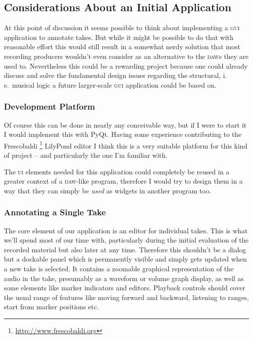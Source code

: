 \documentclass[11pt,a4paper]{article}
\begin{document}
\subsection{Considerations About an Initial Application}
At this point of discussion it seems possible to think about implementing a \textsc{gui} application to annotate takes.
But while it might be possible to do that with reasonable effort this would still result in a somewhat nerdy solution that most recording producers wouldn't even consider as an alternative to the \textsc{daw}s they are used to.
Nevertheless this could be a rewarding project because one could already discuss and solve the fundamental design issues regarding the structural, i.\,e.\ musical logic a future larger-scale \textsc{gui} application could be based on.

\subsubsection{Development Platform}
Of course this can be done in nearly any conceivable way, but if I were to start it I would implement this with PyQt.
Having some experience contributing to the Frescobaldi%
\footnote{\url{http://www.frescobaldi.org}}
LilyPond editor I think this is a very suitable platform for this kind of project -- and particularly the one I'm familiar with.

The \textsc{ui} elements needed for this application could completely be reused in a greater context of a \textsc{daw}-like program, therefore I would try to design them in a way that they can simply be \emph{used} as widgets in another program too.

\subsubsection{Annotating a Single Take}
The core element of our application is an editor for individual takes.
This is what we'll spend most of our time with, particularly during the initial evaluation of the recorded material but also later at any time.
Therefore this shouldn't be a dialog but a dockable panel which is permanently visible and simply gets updated when a new take is selected.
It contains a zoomable graphical representation of the audio in the take, presumably as a waveform or volume graph display, as well as some elements like marker indicators and editors.
Playback controls should cover the usual range of features like moving forward and backward, listening to ranges, start from marker positions etc.
\end{document}
